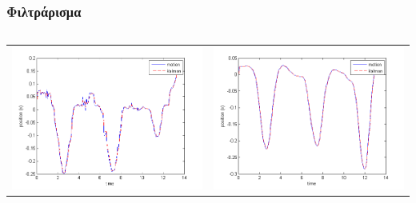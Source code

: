 \documentclass[8pt,sans,mathserif]{beamer}%
\begin{document}
\begin{frame}
\frametitle{Φιλτράρισμα}

    \begin{columns}
        \begin{tabular}{cc}
            \includegraphics[height = 0.30\textheight, keepaspectratio]{fig/filter0-x.png} & \includegraphics[height = 0.30\textheight, keepaspectratio]{fig/filter3-x.png}\\

\end{tabular}
\end{columns}
\end{frame}
\end{document}

